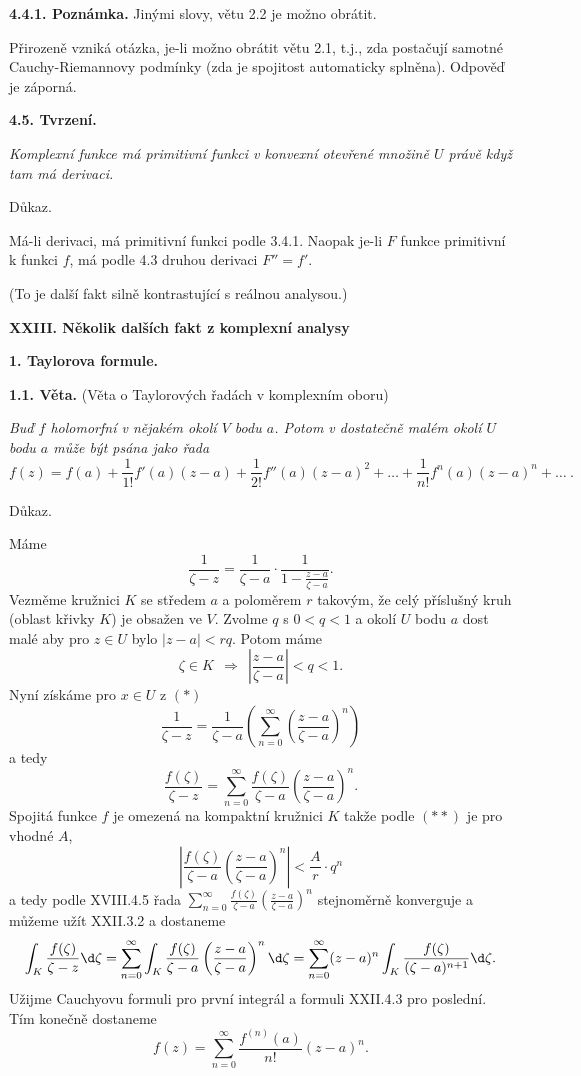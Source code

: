 \documentclass[12pt]{article}
\begin{document}
\medskip

{\bf 4.4.1. Poznámka.} Jinými slovy, větu 2.2 je možno obrátit. 

Přirozeně vzniká otázka, je-li možno obrátit větu 2.1, t.j., zda postačují samotné Cauchy-Riemannovy podmínky (zda je spojitost automaticky splněna). Odpověď je záporná.

 \bigskip
 
 {\bf 4.5. Tvrzení.} {\em Komplexní funkce má primitivní funkci v konvexní otevřené množině  $U$ právě když tam má derivaci.
 
 Důkaz.} Má-li derivaci, má primitivní funkci podle 3.4.1. Naopak je-li  $F$ funkce primitivní k funkci $f$, má podle 4.3 druhou derivaci $F''=f'$.\sq
 
\medskip
(To je další fakt silně kontrastující s reálnou analysou.)




\newpage

\centerline{\Large\bf XXIII. Několik dalších fakt z komplexní analysy} 
 
\vskip10mm

{\large\bf 1. Taylorova formule.}
 
 \bigskip
 
 {\bf 1.1. Věta.} (Věta o Taylorových řadách v komplexním oboru) {\em Buď $f$ holomorfní v nějakém okolí $V$ bodu $a$. Potom v dostatečně malém okolí  $U$ bodu $a$ může být psána jako řada
 $$
 f(z)=f(a)+\frac1{1!}f'(a)(z-a)+\frac1{2!}f''(a)(z-a)^2+\dots+\frac1{n!}f^{n}(a)(z-a)^n+\dots \ .
 $$
 
 Důkaz.} Máme
 \begin{equation}
 \frac1{\zeta-z}=\frac1{\zeta-a}\cdot\frac1{1-\frac{z-a}{\zeta-a}}. \tag{$*$}
 \end{equation}
 Vezměme kružnici $K$ se středem $a$ a poloměrem $r$ takovým, že celý příslušný kruh (oblast křivky $K$) je obsažen ve $V$. Zvolme $q$ s $0<q<1$ a okolí $U$ bodu $a$ dost malé aby pro $z\in U$ bylo $|z-a|<rq$. Potom máme
 \begin{equation}
 \zeta\in K\ \ \Rightarrow\ \ \left|\frac{z-a}{\zeta-a}\right|< q<1. \tag{$**$}
 \end{equation}
 Nyní získáme pro $x\in U$ z $(*)$ 
 $$
  \frac1{\zeta-z}= \frac1{\zeta-a}\left(\sum_{n=0}^\infty\left(\frac{z-a}{\zeta-a}\right)^n\right)
 $$
 a tedy
 $$
  \frac{f(\zeta)}{\zeta-z}= \sum_{n=0}^\infty\frac{f(\zeta)}{\zeta-a}\left(\frac{z-a}{\zeta-a}\right)^n.
 $$
 Spojitá funkce $f$ je omezená na kompaktní kružnici $K$ takže podle $(**)$ je pro vhodné $A$,
 $$
 \left|\frac{f(\zeta)}{\zeta-a}\left(\frac{z-a}{\zeta-a}\right)^n\right|<\frac{A}{r}\cdot q^n
  $$
  a tedy podle XVIII.4.5 řada $\sum_{n=0}^\infty\frac{f(\zeta)}{\zeta-a}\left(\frac{z-a}{\zeta-a}\right)^n$ stejnoměrně konverguje
  a můžeme užít XXII.3.2 a dostaneme
   $$
  \int_K\frac{f(\zeta)}{\zeta-z}\d \zeta= \sum_{n=0}^\infty\int_K\frac{f(\zeta)}{\zeta-a}\left(\frac{z-a}{\zeta-a}\right)^n\d\zeta= 
 \sum_{n=0}^\infty(z-a)^n\int_K\frac{f(\zeta)}{(\zeta-a)^{n+1}}\d\zeta .
 $$
Užijme Cauchyovu formuli pro první integrál a formuli XXII.4.3 pro poslední. Tím konečně dostaneme
$$
f(z)=\sum_{n=0}^\infty\frac{f^{(n)}(a)}{n!}(z-a)^n.
$$ \sq
\end{document}
